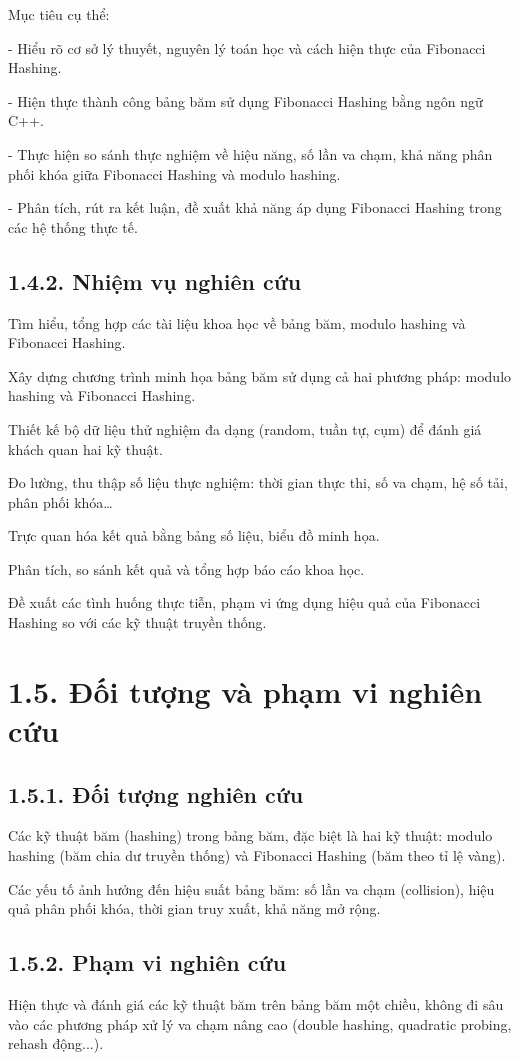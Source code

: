 \documentclass[12pt,a4paper]{report}
\begin{document}
Mục tiêu cụ thể:

- Hiểu rõ cơ sở lý thuyết, nguyên lý toán học và cách hiện thực của Fibonacci Hashing.

- Hiện thực thành công bảng băm sử dụng Fibonacci Hashing bằng ngôn ngữ C++.

- Thực hiện so sánh thực nghiệm về hiệu năng, số lần va chạm, khả năng phân phối khóa giữa Fibonacci Hashing và modulo hashing.

- Phân tích, rút ra kết luận, đề xuất khả năng áp dụng Fibonacci Hashing trong các hệ thống thực tế.
\subsection*{1.4.2. Nhiệm vụ nghiên cứu}
\noindent \indent Tìm hiểu, tổng hợp các tài liệu khoa học về bảng băm, modulo hashing và Fibonacci Hashing.

Xây dựng chương trình minh họa bảng băm sử dụng cả hai phương pháp: modulo hashing và Fibonacci Hashing.

Thiết kế bộ dữ liệu thử nghiệm đa dạng (random, tuần tự, cụm) để đánh giá khách quan hai kỹ thuật.

Đo lường, thu thập số liệu thực nghiệm: thời gian thực thi, số va chạm, hệ số tải, phân phối khóa…

Trực quan hóa kết quả bằng bảng số liệu, biểu đồ minh họa.

Phân tích, so sánh kết quả và tổng hợp báo cáo khoa học.

Đề xuất các tình huống thực tiễn, phạm vi ứng dụng hiệu quả của Fibonacci Hashing so với các kỹ thuật truyền thống.

\section*{1.5. Đối tượng và phạm vi nghiên cứu}
\subsection*{1.5.1. Đối tượng nghiên cứu}
\noindent \indent Các kỹ thuật băm (hashing) trong bảng băm, đặc biệt là hai kỹ thuật: modulo hashing (băm chia dư truyền thống) và Fibonacci Hashing (băm theo tỉ lệ vàng).

Các yếu tố ảnh hưởng đến hiệu suất bảng băm: số lần va chạm (collision), hiệu quả phân phối khóa, thời gian truy xuất, khả năng mở rộng.
\subsection*{1.5.2. Phạm vi nghiên cứu}
\noindent \indent Hiện thực và đánh giá các kỹ thuật băm trên bảng băm một chiều, không đi sâu vào các phương pháp xử lý va chạm nâng cao (double hashing, quadratic probing, rehash động...).
\end{document}
